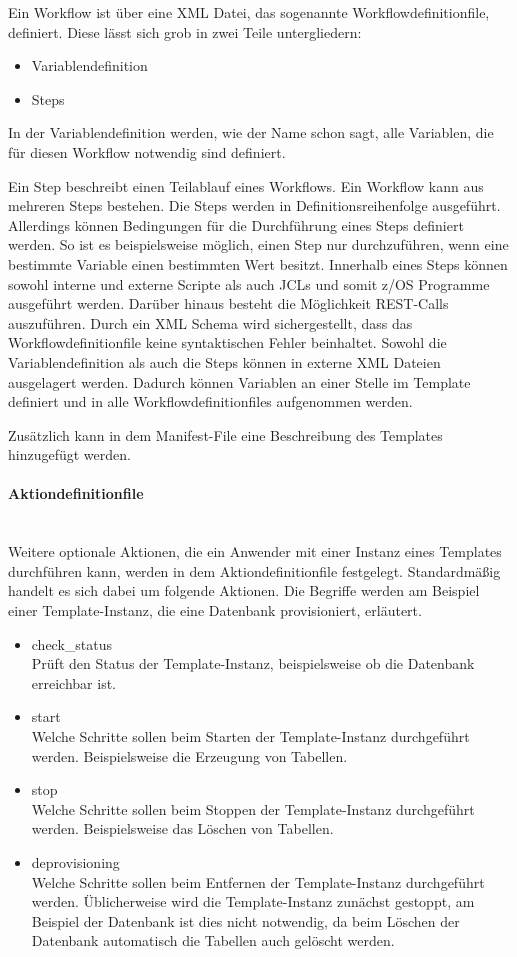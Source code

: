 Ein Workflow ist über eine XML Datei, das sogenannte \glqq Workflowdefinitionfile\grqq, definiert.
Diese lässt sich grob in zwei Teile untergliedern:
\begin{itemize}
\item Variablendefinition
\item Steps
\end{itemize}
In der Variablendefinition werden, wie der Name schon sagt, alle Variablen, die für diesen Workflow notwendig sind definiert.

Ein Step beschreibt einen Teilablauf eines Workflows.
Ein Workflow kann aus mehreren Steps bestehen.
Die Steps werden in Definitionsreihenfolge ausgeführt.
Allerdings können Bedingungen für die Durchführung eines Steps definiert werden.
So ist es beispielsweise möglich, einen Step nur durchzuführen, wenn eine bestimmte Variable einen bestimmten Wert besitzt.
Innerhalb eines Steps können sowohl interne und externe Scripte als auch JCLs und somit z/OS Programme ausgeführt werden.
Darüber hinaus besteht die Möglichkeit REST-Calls auszuführen.
Durch ein XML Schema wird sichergestellt, dass das Workflowdefinitionfile keine syntaktischen Fehler beinhaltet.
Sowohl die Variablendefinition als auch die Steps können in externe XML Dateien ausgelagert werden.
Dadurch können Variablen an einer Stelle im Template definiert und in alle Workflowdefinitionfiles aufgenommen werden.
\cite{Rotthove.2018}

Zusätzlich kann in dem Manifest-File eine Beschreibung des Templates hinzugefügt werden.
\cite{.26.2.2020}
\paragraph{\glqq Aktiondefinitionfile\grqq} ~\\
Weitere optionale Aktionen, die ein Anwender mit einer Instanz eines Templates durchführen kann, werden in dem Aktiondefinitionfile festgelegt.
Standardmäßig handelt es sich dabei um folgende Aktionen.
Die Begriffe werden am Beispiel einer Template-Instanz, die eine Datenbank provisioniert, erläutert.
\begin{itemize}
\item check\_status\\
Prüft den Status der Template-Instanz, beispielsweise ob die Datenbank erreichbar ist.
\item start\\
Welche Schritte sollen beim Starten der Template-Instanz durchgeführt werden.
Beispielsweise die Erzeugung von Tabellen.
\item stop\\
Welche Schritte sollen beim Stoppen der Template-Instanz durchgeführt werden.
Beispielsweise das Löschen von Tabellen.
\item deprovisioning\\
Welche Schritte sollen beim Entfernen der Template-Instanz durchgeführt werden.
Üblicherweise wird die Template-Instanz zunächst gestoppt, am Beispiel der Datenbank ist dies nicht notwendig, da beim Löschen der Datenbank automatisch die Tabellen auch gelöscht werden.
\end{itemize}

